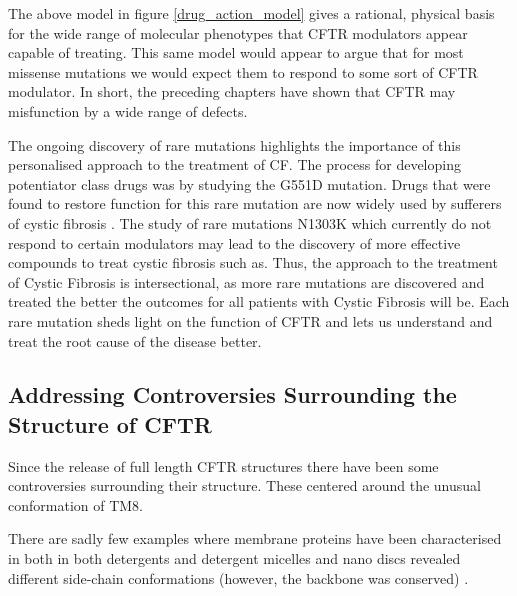 The above model in figure \ref{drug_action_model} gives a rational, physical basis for the wide range of molecular phenotypes that CFTR modulators appear capable of treating. This same model would appear to argue that for most missense mutations we would expect them to respond to some sort of CFTR modulator. In short, the preceding chapters have shown that CFTR may misfunction by a wide range of defects. 

The ongoing discovery of rare mutations highlights the importance of this personalised approach to the treatment of CF. The process for developing potentiator class drugs was by studying the G551D mutation. Drugs that were found to restore function for this rare mutation are now widely used by sufferers of cystic fibrosis \cite{vangoor2009}. The study of rare mutations N1303K which currently do not respond to certain modulators may lead to the discovery of more effective compounds to treat cystic fibrosis such as. Thus, the approach to the treatment of Cystic Fibrosis is intersectional, as more rare mutations are discovered and treated the better the outcomes for all patients with Cystic Fibrosis will be. Each rare mutation sheds light on the function of CFTR and lets us understand and treat the root cause of the disease better.

\subsection{Addressing Controversies Surrounding the Structure of CFTR}

Since the release of full length CFTR structures there have been some controversies surrounding their structure. These centered around the unusual conformation of TM8.

There are sadly few examples where membrane proteins have been characterised in both in both detergents and detergent micelles and nano discs revealed different side-chain conformations (however, the backbone was conserved) \cite{autzen2019, gao2016, cheng2015}. 



